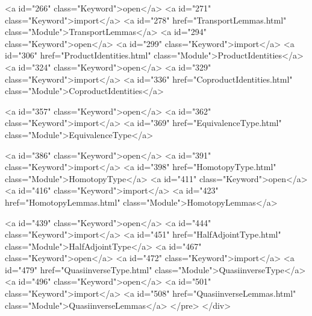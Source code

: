 <a id="266" class="Keyword">open</a> <a id="271" class="Keyword">import</a> <a id="278" href="TransportLemmas.html" class="Module">TransportLemmas</a>
<a id="294" class="Keyword">open</a> <a id="299" class="Keyword">import</a> <a id="306" href="ProductIdentities.html" class="Module">ProductIdentities</a>
<a id="324" class="Keyword">open</a> <a id="329" class="Keyword">import</a> <a id="336" href="CoproductIdentities.html" class="Module">CoproductIdentities</a>

<a id="357" class="Keyword">open</a> <a id="362" class="Keyword">import</a> <a id="369" href="EquivalenceType.html" class="Module">EquivalenceType</a>

<a id="386" class="Keyword">open</a> <a id="391" class="Keyword">import</a> <a id="398" href="HomotopyType.html" class="Module">HomotopyType</a>
<a id="411" class="Keyword">open</a> <a id="416" class="Keyword">import</a> <a id="423" href="HomotopyLemmas.html" class="Module">HomotopyLemmas</a>

<a id="439" class="Keyword">open</a> <a id="444" class="Keyword">import</a> <a id="451" href="HalfAdjointType.html" class="Module">HalfAdjointType</a>
<a id="467" class="Keyword">open</a> <a id="472" class="Keyword">import</a> <a id="479" href="QuasiinverseType.html" class="Module">QuasiinverseType</a>
<a id="496" class="Keyword">open</a> <a id="501" class="Keyword">import</a> <a id="508" href="QuasiinverseLemmas.html" class="Module">QuasiinverseLemmas</a>
</pre>
</div>

